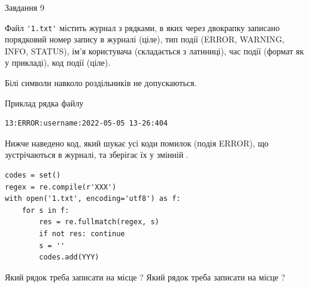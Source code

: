 \documentclass[12pt, ukrainian]{article}
\def\code#1{\Verb!#1!}
\begin{document}
{\begin{minipage}[t]{8.0cm}
\end{minipage}

               
{\begin{center}Завдання {9}\end{center}}
\vspace{-4mm}
Файл \code{'1.txt'} містить журнал з рядками, в яких через двокрапку записано поряд\-ко\-вий номер запису в журналі (ціле), тип події (ERROR, WARNING, INFO, STATUS), ім'я користувача (складається з латиниці), час події (фор\-мат як у прикладі), код події (ціле).

Білі символи навколо роздільників не допускаються.

Приклад рядка файлу



\begin{verbatim}
13:ERROR:username:2022-05-05 13-26:404
\end{verbatim}


Нижче наведено код, який шукає усі коди помилок (подія ERROR), що зустріча\-ють\-ся в журналі, та зберігає їх у змінній .



\begin{verbatim}
codes = set()
regex = re.compile(r'XXX')
with open('1.txt', encoding='utf8') as f:
    for s in f:
        res = re.fullmatch(regex, s)
        if not res: continue
        s = ''
        codes.add(YYY)
\end{verbatim}



Який рядок треба записати на місце  ?
Який рядок треба записати на місце  ?\par

}
\end{document}
